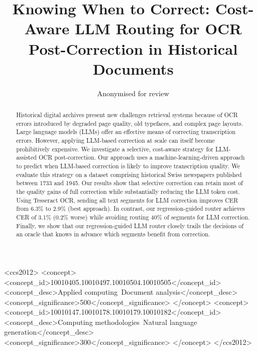 \documentclass[sigconf]{acmart}
\begin{document}
\title{Knowing When to Correct: Cost-Aware LLM Routing for OCR Post-Correction in Historical Documents}
\author{Anonymised for review}
%
%

\renewcommand{\shortauthors}{Anonymised for review}
\begin{abstract}
Historical digital archives present new challenges retrieval systems because of OCR errors introduced by degraded page quality, old typefaces, and complex page layouts. Large language models (LLMs) offer an effective means of correcting transcription errors. However, applying LLM-based correction at scale can itself become prohibitively expensive. We investigate a selective, cost-aware strategy for LLM-assisted OCR post-correction. Our approach uses a machine-learning-driven approach to predict when LLM-based correction is likely to improve transcription quality. 
We evaluate this strategy on a dataset comprising historical Swiss newspapers published between 1733 and 1945. Our results show that selective correction can retain most of the quality gains of full correction while substantially reducing the LLM token cost. Using Tesseract OCR, sending all text segments for LLM correction improves CER from 6.3\% to 2.9\% (best approach). In contrast, our regression-guided router achieves CER of 3.1\% (0.2\% worse) while avoiding routing 40\% of segments for LLM correction. Finally, we show that our regression-guided LLM router closely trails the decisions of an oracle that knows in advance which segments benefit from correction.
\end{abstract}



\begin{CCSXML}
<ccs2012>
 <concept>
  <concept_id>10010405.10010497.10010504.10010505</concept_id>
  <concept_desc>Applied computing~Document analysis</concept_desc>
  <concept_significance>500</concept_significance>
 </concept>
 <concept>
  <concept_id>10010147.10010178.10010179.10010182</concept_id>
  <concept_desc>Computing methodologies~Natural language generation</concept_desc>
  <concept_significance>300</concept_significance>
 </concept>
</ccs2012>
\end{CCSXML}
\end{document}
